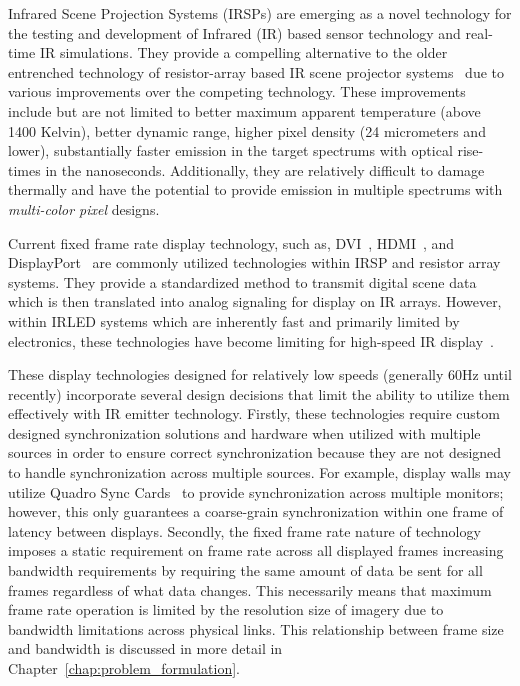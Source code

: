 \label{chap:introduction}

Infrared Scene Projection Systems (IRSPs) are emerging as a novel technology for the testing and development of Infrared (IR) based sensor technology and real-time IR simulations. They provide a compelling alternative to the older entrenched technology of resistor-array based IR scene projector systems~\cite{PritchardEtAl1998,WilliamsEtAl2005} due to various improvements over the competing technology. These improvements include but are not limited to better maximum apparent temperature (above 1400 Kelvin), better dynamic range, higher pixel density (24 micrometers and lower), substantially faster emission in the target spectrums with optical rise-times in the nanoseconds. Additionally, they are relatively difficult to damage thermally and have the potential to provide emission in multiple spectrums with \emph{multi-color pixel} designs.

Current fixed frame rate display technology, such as, DVI~\cite{DDWG1999}, HDMI~\cite{HDMIForum2018}, and DisplayPort~\cite{BhowmikEtAl2012} are commonly utilized technologies within IRSP and resistor array systems. They provide a standardized method to transmit digital scene data which is then translated into analog signaling for display on IR arrays. However, within IRLED systems which are inherently fast and primarily limited by electronics, these technologies have become limiting for high-speed IR display~\cite{LaVeignePrewarski2013}.

These display technologies designed for relatively low speeds (generally 60Hz until recently) incorporate several design decisions that limit the ability to utilize them effectively with IR emitter technology. Firstly, these technologies require custom designed synchronization solutions and hardware when utilized with multiple sources in order to ensure correct synchronization because they are not designed to handle synchronization across multiple sources. For example, display walls may utilize Quadro Sync Cards~\cite{NVIDIA2020_2} to provide synchronization across multiple monitors; however, this only guarantees  a coarse-grain synchronization within one frame of latency between displays. Secondly, the fixed frame rate nature of technology imposes a static requirement on frame rate across all displayed frames increasing bandwidth requirements by requiring the same amount of data be sent for all frames regardless of what data changes. This necessarily means that maximum frame rate operation is limited by the resolution size of imagery due to bandwidth limitations across physical links. This relationship between frame size and bandwidth is discussed in more detail in Chapter~\ref{chap:problem_formulation}.

